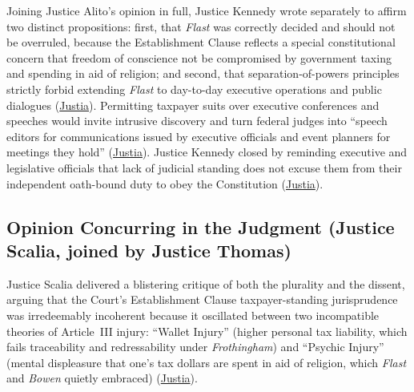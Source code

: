 \documentclass[12pt]{article}
\begin{document}
Joining Justice Alito's opinion in full, Justice Kennedy wrote separately to affirm two distinct propositions: first, that \textit{Flast} was correctly decided and should not be overruled, because the Establishment Clause reflects a special constitutional concern that freedom of conscience not be compromised by government taxing and spending in aid of religion; and second, that separation-of-powers principles strictly forbid extending \textit{Flast} to day-to-day executive operations and public dialogues (\href{https://supreme.justia.com/cases/federal/us/551/587/}{Justia}). Permitting taxpayer suits over executive conferences and speeches would invite intrusive discovery and turn federal judges into ``speech editors for communications issued by executive officials and event planners for meetings they hold'' (\href{https://supreme.justia.com/cases/federal/us/551/587/}{Justia}). Justice Kennedy closed by reminding executive and legislative officials that lack of judicial standing does not excuse them from their independent oath-bound duty to obey the Constitution (\href{https://supreme.justia.com/cases/federal/us/551/587/}{Justia}).

\subsection{Opinion Concurring in the Judgment (Justice Scalia, joined by Justice Thomas)}

Justice Scalia delivered a blistering critique of both the plurality and the dissent, arguing that the Court's Establishment Clause taxpayer-standing jurisprudence was irredeemably incoherent because it oscillated between two incompatible theories of Article~III injury: ``Wallet Injury'' (higher personal tax liability, which fails traceability and redressability under \textit{Frothingham}) and ``Psychic Injury'' (mental displeasure that one's tax dollars are spent in aid of religion, which \textit{Flast} and \textit{Bowen} quietly embraced) (\href{https://supreme.justia.com/cases/federal/us/551/587/}{Justia}).
\end{document}
